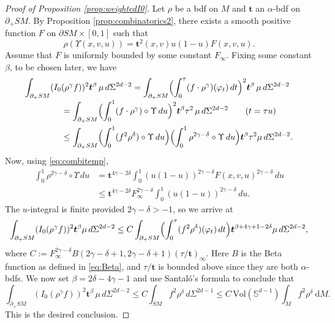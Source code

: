 \documentclass[JEP,XML,SOM,Unicode,NoFloatCountersInSection, NoEqCountersInSection,published]{cedram}
\theoremstyle{plain}
\theoremstyle{definition}
\theoremstyle{remark}
\def\Sm{\mathbb{S}}
\newcommand{\bt}{{\boldsymbol{t}}}
\newcommand {\dM}{\mathrm{d}M}
\newcommand{\del}{\partial}
\begin{document}
\begin{proof}[Proof of Proposition \ref{prop:weightedI0}] Let $\rho$ be a bdf on $M$ and $\bt$ an $\alpha$-bdf on $\partial_+ SM$. By Proposition \ref{prop:combinatorics2}, there exists a smooth positive function $F$ on $\del SM\times [0,1]$ such that\vspace*{-3pt}
\begin{equation}
\rho (\Upsilon(x,v,u)) = \bt^2 (x,v) u(1-u) F(x,v,u).
\label{eq:combitemp}
\end{equation}
Assume that $F$ is uniformly bounded by some constant $F_\infty$. Fixing some constant $\beta$, to be chosen later, we have\vspace*{-5pt}
\begin{align*}
\int_{\partial_+ SM} (I_0 &(\rho^\gamma f))^2 \bt^\beta \, \mu \, d\Sigma^{2d-2} = \int_{\partial_+ SM} \Bigl(\int_0^\tau (f\cdot \rho^\gamma) (\varphi_t)\,dt \Bigr)^2 \bt^{\beta} \, \mu\,d\Sigma^{2d-2} \\[-3pt]
&= \int_{\partial_+ SM} \Bigl(\int_0^1 (f\cdot \rho^\gamma)\circ \Upsilon\,du \Bigr)^2 \bt^{\beta} \tau^2 \, \mu\,d\Sigma^{2d-2} \qquad (t=\tau u)\\
&\le \int_{\partial_+ SM} \Bigl(\int_0^1 (f^2 \rho^\delta)\circ \Upsilon\,du\Bigr) \Bigl(\int_0^1 \rho^{2\gamma-\delta}\circ \Upsilon\,du \Bigr) \bt^{\beta} \tau^2 \mu\,d\Sigma^{2d-2}.
\end{align*}
Now, using \eqref{eq:combitemp},
\begin{align*}
\int_0^1 \rho^{2\gamma-\delta}\circ \Upsilon\,du &= \bt^{4\gamma-2\delta} \int_0^1 (u(1-u))^{2\gamma-\delta} F(x,v,u)^{2\gamma-\delta}\,du \\
&\le \bt^{4\gamma-2\delta} F_{\infty}^{2\gamma-\delta} \int_0^1 (u(1-u))^{2\gamma-\delta}\,du.
\end{align*}
The $u$-integral is finite provided $2\gamma-\delta >-1$, so we arrive at
\begin{equation*}
\int_{\partial_+ SM} (I_0 (\rho^\gamma f))^2 \bt^\beta \mu\,d\Sigma^{2d-2} \le C \int_{\partial_+ SM} \Bigl(\int_0^\tau (f^2 \rho^\delta) (\varphi_t)\,dt\Bigr) \bt^{\beta+4\gamma+1-2\delta} \mu\,d\Sigma^{2d-2},
\end{equation*}
where $C := F_\infty^{2\gamma-\delta} B(2\gamma-\delta+1, 2\gamma-\delta+1) (\tau/\bt)_\infty$. Here $B$ is the Beta function as defined in \eqref{eq:Beta}, and $\tau/\bt$ is bounded above since they are both $\alpha$-bdfs. We now set $\beta = 2\delta-4\gamma-1$ and use Santaló's formula to conclude that
\begin{equation*}
\int_{\partial_+ SM} (I_0 (\rho^\gamma f))^2 \bt^\beta \, \mu \, d\Sigma^{2d-2} \le C \int_{SM} f^2 \rho^{\delta}\,d\Sigma^{2d-1} \le
C\, \mathrm{Vol}(\Sm^{d-1}) \int_M f^2 \rho^\delta\ \dM.
\end{equation*}
This is the desired conclusion.
\end{proof}
\end{document}
